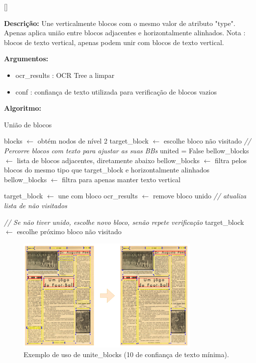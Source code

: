 [\normalsize]

\textbf{Descrição:} Une verticalmente blocos com o mesmo valor de atributo "type". Apenas aplica união entre blocos adjacentes e horizontalmente alinhados. Nota : blocos de texto vertical, apenas podem unir com blocos de texto vertical.

\textbf{Argumentos:}
\begin{itemize}\setlength\itemsep{-0.3em}
	\item ocr\_results : OCR Tree a limpar
	\item conf : confiança de texto utilizada para verificação de blocos vazios
\end{itemize}

\textbf{Algoritmo:}
\begin{breakablealgorithm}
	\caption{União de blocos}
	\begin{algorithmic}[1]
		
		\State blocks $\leftarrow$ obtém nodos de nível 2
		\State target\_block $\leftarrow$ escolhe bloco não visitado
		\State \textit{// Percorre blocos com texto para ajustar as suas BBs}
			\State united = False
			\State bellow\_blocks $\leftarrow$ lista de blocos adjacentes, diretamente abaixo
			\State bellow\_blocks $\leftarrow$ filtra pelos blocos do mesmo tipo que target\_block e horizontalmente alinhados
					\State bellow\_blocks $\leftarrow$ filtra para apenas manter texto vertical
				\EndIf
				
					\State target\_block $\leftarrow$ une com bloco
					\State ocr\_results $\leftarrow$ remove bloco unido
					\State \textit{// atualiza lista de não visitados}
				\EndIf
				
			\EndIf
			
			\State \textit{// Se não tiver unido, escolhe novo bloco, senão repete verificação}
				\State target\_block $\leftarrow$ escolhe próximo bloco não visitado
			\EndIf
		\EndWhile
		
		
	\end{algorithmic}
\end{breakablealgorithm}


\begin{figure}[H]
	\centering
	\includegraphics[width=0.8\textwidth]{images/ilustracoes/unite_blocks.png}
	\caption{Exemplo de uso de unite\_blocks (10 de confiança de texto mínima).}
	\label{fig:unite_blocks}
\end{figure}


